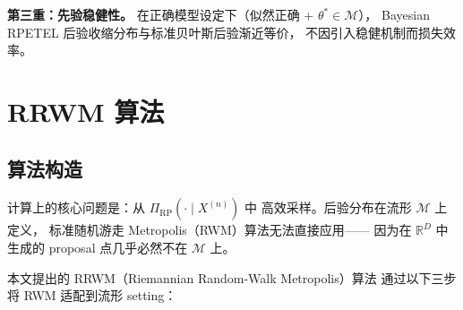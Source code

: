 \textbf{第三重：先验稳健性。}
在正确模型设定下（似然正确 + $\theta^*\in\mathcal{M}$），
Bayesian RPETEL 后验收缩分布与标准贝叶斯后验渐近等价，
不因引入稳健机制而损失效率。


\section{RRWM 算法}\label{sec:ch1-rrwm}

\subsection{算法构造}\label{sec:ch1-rrwm-algo}

计算上的核心问题是：从 $\Pi_{\mathrm{RP}}(\cdot\mid X^{(n)})$ 中
高效采样。后验分布在流形 $\mathcal{M}$ 上定义，
标准随机游走 Metropolis（RWM）算法无法直接应用——
因为在 $\mathbb{R}^D$ 中生成的 proposal 点几乎必然不在 $\mathcal{M}$ 上。

本文提出的 RRWM（Riemannian Random-Walk Metropolis）算法
通过以下三步将 RWM 适配到流形 setting：

